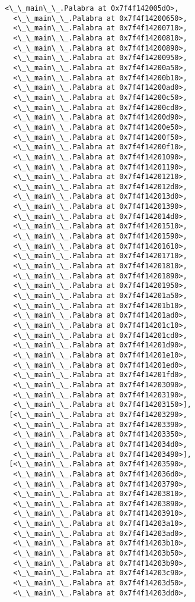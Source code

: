 \documentclass[12pt,a4paper,table]{article}
\begin{document}
\begin{tcolorbox}[breakable, size=fbox, boxrule=.5pt, pad at break*=1mm, opacityfill=0]
\begin{Verbatim}[commandchars=\\\{\}]
  <\_\_main\_\_.Palabra at 0x7f4f142005d0>,
  <\_\_main\_\_.Palabra at 0x7f4f14200650>,
  <\_\_main\_\_.Palabra at 0x7f4f14200710>,
  <\_\_main\_\_.Palabra at 0x7f4f14200810>,
  <\_\_main\_\_.Palabra at 0x7f4f14200890>,
  <\_\_main\_\_.Palabra at 0x7f4f14200950>,
  <\_\_main\_\_.Palabra at 0x7f4f14200a50>,
  <\_\_main\_\_.Palabra at 0x7f4f14200b10>,
  <\_\_main\_\_.Palabra at 0x7f4f14200ad0>,
  <\_\_main\_\_.Palabra at 0x7f4f14200c50>,
  <\_\_main\_\_.Palabra at 0x7f4f14200cd0>,
  <\_\_main\_\_.Palabra at 0x7f4f14200d90>,
  <\_\_main\_\_.Palabra at 0x7f4f14200e50>,
  <\_\_main\_\_.Palabra at 0x7f4f14200f50>,
  <\_\_main\_\_.Palabra at 0x7f4f14200f10>,
  <\_\_main\_\_.Palabra at 0x7f4f14201090>,
  <\_\_main\_\_.Palabra at 0x7f4f14201190>,
  <\_\_main\_\_.Palabra at 0x7f4f14201210>,
  <\_\_main\_\_.Palabra at 0x7f4f142012d0>,
  <\_\_main\_\_.Palabra at 0x7f4f142013d0>,
  <\_\_main\_\_.Palabra at 0x7f4f14201390>,
  <\_\_main\_\_.Palabra at 0x7f4f142014d0>,
  <\_\_main\_\_.Palabra at 0x7f4f14201510>,
  <\_\_main\_\_.Palabra at 0x7f4f14201590>,
  <\_\_main\_\_.Palabra at 0x7f4f14201610>,
  <\_\_main\_\_.Palabra at 0x7f4f14201710>,
  <\_\_main\_\_.Palabra at 0x7f4f14201810>,
  <\_\_main\_\_.Palabra at 0x7f4f14201890>,
  <\_\_main\_\_.Palabra at 0x7f4f14201950>,
  <\_\_main\_\_.Palabra at 0x7f4f14201a50>,
  <\_\_main\_\_.Palabra at 0x7f4f14201b10>,
  <\_\_main\_\_.Palabra at 0x7f4f14201ad0>,
  <\_\_main\_\_.Palabra at 0x7f4f14201c10>,
  <\_\_main\_\_.Palabra at 0x7f4f14201cd0>,
  <\_\_main\_\_.Palabra at 0x7f4f14201d90>,
  <\_\_main\_\_.Palabra at 0x7f4f14201e10>,
  <\_\_main\_\_.Palabra at 0x7f4f14201ed0>,
  <\_\_main\_\_.Palabra at 0x7f4f14201fd0>,
  <\_\_main\_\_.Palabra at 0x7f4f14203090>,
  <\_\_main\_\_.Palabra at 0x7f4f14203190>,
  <\_\_main\_\_.Palabra at 0x7f4f14203150>],
 [<\_\_main\_\_.Palabra at 0x7f4f14203290>,
  <\_\_main\_\_.Palabra at 0x7f4f14203390>,
  <\_\_main\_\_.Palabra at 0x7f4f14203350>,
  <\_\_main\_\_.Palabra at 0x7f4f142034d0>,
  <\_\_main\_\_.Palabra at 0x7f4f14203490>],
 [<\_\_main\_\_.Palabra at 0x7f4f14203590>,
  <\_\_main\_\_.Palabra at 0x7f4f142036d0>,
  <\_\_main\_\_.Palabra at 0x7f4f14203790>,
  <\_\_main\_\_.Palabra at 0x7f4f14203810>,
  <\_\_main\_\_.Palabra at 0x7f4f14203890>,
  <\_\_main\_\_.Palabra at 0x7f4f14203910>,
  <\_\_main\_\_.Palabra at 0x7f4f14203a10>,
  <\_\_main\_\_.Palabra at 0x7f4f14203ad0>,
  <\_\_main\_\_.Palabra at 0x7f4f14203b10>,
  <\_\_main\_\_.Palabra at 0x7f4f14203b50>,
  <\_\_main\_\_.Palabra at 0x7f4f14203b90>,
  <\_\_main\_\_.Palabra at 0x7f4f14203c90>,
  <\_\_main\_\_.Palabra at 0x7f4f14203d50>,
  <\_\_main\_\_.Palabra at 0x7f4f14203dd0>,

\end{Verbatim}
\end{tcolorbox}
\end{document}
